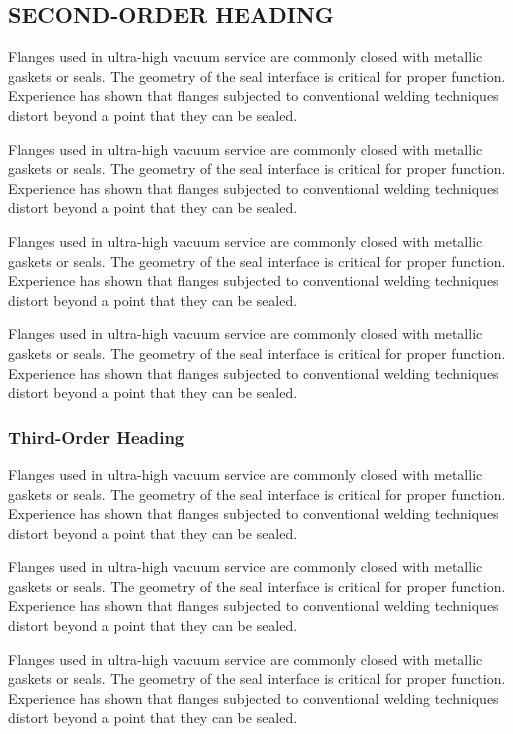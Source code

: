 \documentclass[11pt,letterpaper,twoside,english,final]{article}
\begin{document}
{\subsection{SECOND-ORDER HEADING}

Flanges used in ultra-high vacuum service are commonly closed with metallic gaskets or seals. The geometry of the seal interface is critical for proper function. Experience has shown that flanges subjected to conventional welding techniques distort beyond a point that they can be sealed.

Flanges used in ultra-high vacuum service are commonly closed with metallic gaskets or seals. The geometry of the seal interface is critical for proper function. Experience has shown that flanges subjected to conventional welding techniques distort beyond a point that they can be sealed.

Flanges used in ultra-high vacuum service are commonly closed with metallic gaskets or seals. The geometry of the seal interface is critical for proper function. Experience has shown that flanges subjected to conventional welding techniques distort beyond a point that they can be sealed.

Flanges used in ultra-high vacuum service are commonly closed with metallic gaskets or seals. The geometry of the seal interface is critical for proper function. Experience has shown that flanges subjected to conventional welding techniques distort beyond a point that they can be sealed.

\newpage
\subsubsection{Third-Order Heading}

Flanges used in ultra-high vacuum service are commonly closed with metallic gaskets or seals. The geometry of the seal interface is critical for proper function. Experience has shown that flanges subjected to conventional welding techniques distort beyond a point that they can be sealed.

Flanges used in ultra-high vacuum service are commonly closed with metallic gaskets or seals. The geometry of the seal interface is critical for proper function. Experience has shown that flanges subjected to conventional welding techniques distort beyond a point that they can be sealed.

Flanges used in ultra-high vacuum service are commonly closed with metallic gaskets or seals. The geometry of the seal interface is critical for proper function. Experience has shown that flanges subjected to conventional welding techniques distort beyond a point that they can be sealed.

}
\end{document}

